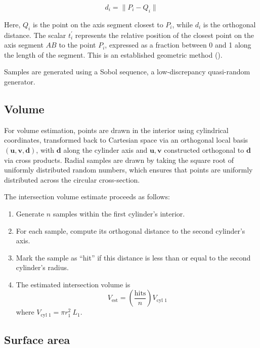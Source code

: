 \documentclass[authoryear]{elsarticle}
\begin{document}
    \begin{equation*}
        d_{i} = \| P_{i} - Q_{i}\|    
    \end{equation*}

    Here, $Q_{i}$ is the point on the axis segment closest to $P_{i}$, while $d_{i}$ is the orthogonal distance. 
    The scalar $t_{i}^{'}$ represents the relative position of the closest point on the axis segment $AB$ to the point $P_{i}$, expressed as a fraction between 0 and 1 along the length of the segment. 
    This is an established geometric method (\cite{ericson2005}).
    
    Samples are generated using a Sobol sequence, a low-discrepancy quasi-random generator.

\subsection{Volume}
    
    For volume estimation, points are drawn in the interior using cylindrical coordinates, transformed back to Cartesian space via an orthogonal local basis $(\mathbf{u},\mathbf{v},\mathbf{d})$, with $\mathbf{d}$ along the cylinder axis and $\mathbf{u},\mathbf{v}$ constructed orthogonal to $\mathbf{d}$ via cross products. Radial samples are drawn by taking the square root of uniformly distributed random numbers, which ensures that points are uniformly distributed across the circular cross-section.
    
    The intersection volume estimate proceeds as follows:
    
    \begin{enumerate}
        \item Generate $n$ samples within the first cylinder's interior.
        \item For each sample, compute its orthogonal distance to the second cylinder's axis.
        \item Mark the sample as ``hit'' if this distance is less than or equal to the second cylinder's radius.
        \item The estimated intersection volume is
        \[
        V_{\text{est}} = \left( \frac{\text{hits}}{n} \right) V_{\text{cyl 1}}
        \]
        where $V_{\text{cyl 1}} = \pi r_{1}^{2}\ L_{1}$.
    \end{enumerate}
    
\subsection{Surface area}
\end{document}
